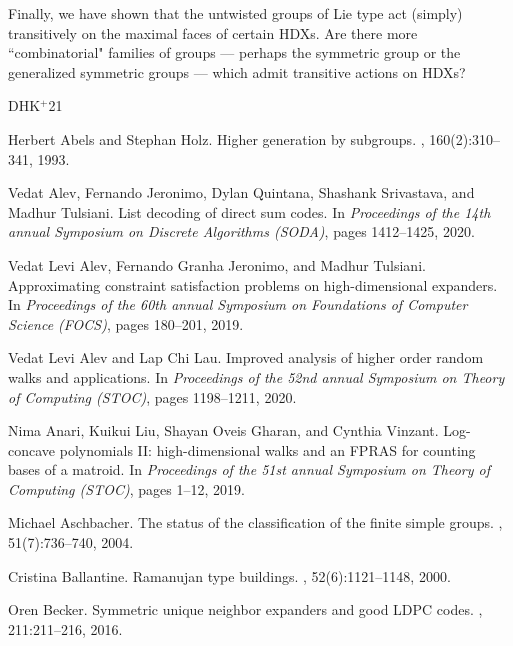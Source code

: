 \documentclass[10pt,a4paper]{article}
\theoremstyle{definition}
\begin{document}
Finally, we have shown that the untwisted groups of Lie type act (simply) transitively on the maximal faces of certain HDXs. Are there more ``combinatorial" families of groups --- perhaps the symmetric group or the generalized symmetric groups --- which admit transitive actions on HDXs?
\nocite{Sch10}

\newcommand{\etalchar}[1]{$^{#1}$}
\begin{thebibliography}{DHK{\etalchar{+}}21}

Herbert Abels and Stephan Holz.
\newblock Higher generation by subgroups.
, 160(2):310--341, 1993.

\bibitem[AJQ{\etalchar{+}}20]{AJQST20}
Vedat Alev, Fernando Jeronimo, Dylan Quintana, Shashank Srivastava, and Madhur
  Tulsiani.
\newblock List decoding of direct sum codes.
\newblock In {\em Proceedings of the 14th annual Symposium on Discrete
  Algorithms (SODA)}, pages 1412--1425, 2020.

Vedat{ }Levi Alev, Fernando{ }Granha Jeronimo, and Madhur Tulsiani.
\newblock Approximating constraint satisfaction problems on high-dimensional
  expanders.
\newblock In {\em Proceedings of the 60th annual Symposium on Foundations of
  Computer Science (FOCS)}, pages 180--201, 2019.

Vedat{ }Levi Alev and Lap{ }Chi Lau.
\newblock Improved analysis of higher order random walks and applications.
\newblock In {\em Proceedings of the 52nd annual Symposium on Theory of
  Computing (STOC)}, pages 1198--1211, 2020.

Nima Anari, Kuikui Liu, Shayan Oveis{ }Gharan, and Cynthia Vinzant.
\newblock Log-concave polynomials {II}: high-dimensional walks and an {FPRAS}
  for counting bases of a matroid.
\newblock In {\em Proceedings of the 51st annual Symposium on Theory of
  Computing (STOC)}, pages 1--12, 2019.

Michael Aschbacher.
\newblock The status of the classification of the finite simple groups.
, 51(7):736--740,
  2004.

Cristina Ballantine.
\newblock Ramanujan type buildings.
, 52(6):1121--1148, 2000.

Oren Becker.
\newblock Symmetric unique neighbor expanders and good {LDPC} codes.
, 211:211--216, 2016.


\end{thebibliography}
\end{document}
